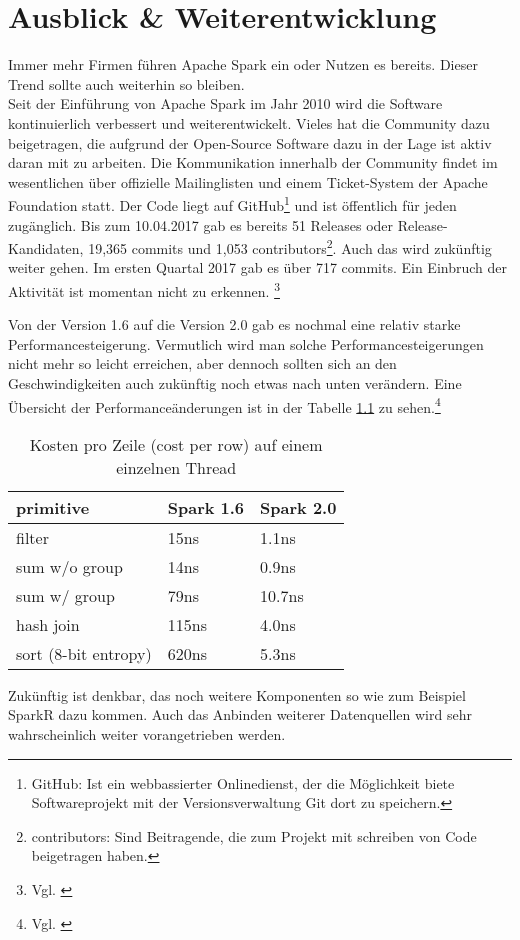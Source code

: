 \newpage
\chapter{Ausblick \& Weiterentwicklung} 

Immer mehr Firmen führen Apache Spark ein oder Nutzen es bereits. Dieser Trend sollte auch weiterhin so bleiben. \\


\noindent
Seit der Einführung von Apache Spark im Jahr 2010 wird die Software kontinuierlich verbessert und weiterentwickelt. 
Vieles hat die Community dazu beigetragen, die aufgrund der Open-Source Software dazu in der Lage ist aktiv daran mit zu arbeiten. 
Die Kommunikation innerhalb der Community findet im wesentlichen über offizielle Mailinglisten und einem Ticket-System der Apache Foundation statt.
Der Code liegt auf GitHub\footnote{GitHub: Ist ein webbassierter Onlinedienst, der die Möglichkeit biete Softwareprojekt mit der Versionsverwaltung Git dort zu speichern.} und ist öffentlich für jeden zugänglich. 
Bis zum 10.04.2017 gab es bereits 51 Releases oder Release-Kandidaten, 19,365 commits und 1,053 contributors\footnote{contributors: Sind Beitragende, die zum Projekt mit schreiben von Code beigetragen haben. }.
Auch das wird zukünftig weiter gehen. Im ersten Quartal 2017 gab es über 717 commits. Ein Einbruch der Aktivität ist momentan nicht zu erkennen. \footnote{Vgl. \cite{GITHUB}}


\noindent
Von der Version 1.6 auf die Version 2.0 gab es nochmal eine relativ starke Performancesteigerung. Vermutlich wird man solche Performancesteigerungen nicht mehr so leicht erreichen, aber dennoch sollten sich an den Geschwindigkeiten auch zukünftig noch etwas nach unten verändern. Eine Übersicht der Performanceänderungen ist in der Tabelle \ref{tab:spark_2_0} zu sehen.\footnote{Vgl. \cite{DATABRICK_SPARK_2_0}}


\begin{table}[h]
  \centering
		
		  \begin{tabular}[t]{|l|l|l|}
    \hline
		
		\rowcolor[gray]{.9}
		
				primitive	 & Spark 1.6 &  Spark 2.0 \\ \hline				
				filter &	15ns &	1.1ns \\ \hline				
				sum w/o group &	14ns &	0.9ns \\ \hline				
				sum w/ group &	79ns &	10.7ns \\ \hline				
				hash join	& 115ns	& 4.0ns \\ \hline				
				sort (8-bit entropy)	& 620ns	 & 5.3ns \\ \hline				

  \end{tabular}
		
  \caption{Kosten pro Zeile (cost per row) auf einem einzelnen Thread}\label{tab:spark_2_0}
\end{table}



\noindent
Zukünftig ist denkbar, das noch weitere Komponenten so wie zum Beispiel SparkR dazu kommen. Auch das Anbinden weiterer Datenquellen wird sehr wahrscheinlich weiter vorangetrieben werden.